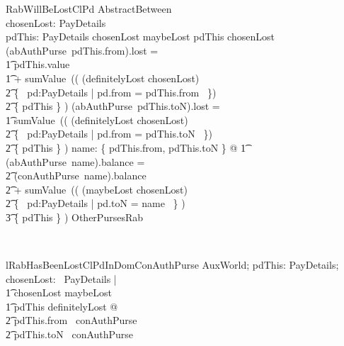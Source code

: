 \begin{LSDef}
\begin{schema}{RabWillBeLostClPd}
  AbstractBetween
  \\ %
  chosenLost: \power PayDetails
  \\ %
  pdThis: PayDetails
\where %
  chosenLost \subseteq maybeLost
  \also %
  pdThis \in chosenLost
  \also %
  (abAuthPurse~pdThis.from).lost =
  \\ %
  \t1 pdThis.value
  \\ %
  \t1 {} + sumValue~(( (definitelyLost \cup chosenLost)
  \\ %
  \t2 {} \cap \{~ pd:PayDetails | pd.from = pdThis.from ~\})
  \\ %
  \t2 \setminus \{ pdThis \} )
  \also %
  (abAuthPurse~pdThis.toN).lost =
  \\ %
  \t1 sumValue~(( (definitelyLost \cup chosenLost)
  \\ %
  \t2 {} \cap \{~ pd:PayDetails | pd.from = pdThis.toN ~\})
  \\ %
  \t2 \setminus \{ pdThis \} )
  \also %
  \forall name: \{ pdThis.from, pdThis.toN \} @
  \also %
  \t1 (abAuthPurse~name).balance =
  \\ %
  \t2 (conAuthPurse~name).balance
  \\ %
  \t2 {} + sumValue~(( (maybeLost \setminus chosenLost)
  \\ %
  \t2 {} \cap \{~ pd:PayDetails | pd.toN = name ~\} )
  \\ %
  \t3 \setminus \{ pdThis \} )
  \also %
  OtherPursesRab
\end{schema}~\end{LSDef}

\begin{LNewLemma}
\begin{theorem}{lRabHasBeenLostClPdInDomConAuthPurse}
    \forall AuxWorld; pdThis: PayDetails; chosenLost: \power~PayDetails | \\
        \t1 chosenLost \subseteq maybeLost \\
        \t1 \land pdThis \in definitelyLost @ \\
            \t2 pdThis.from \in \dom~conAuthPurse \\
            \t2 \land pdThis.toN \in \dom~conAuthPurse
\end{theorem}~\end{LNewLemma}

